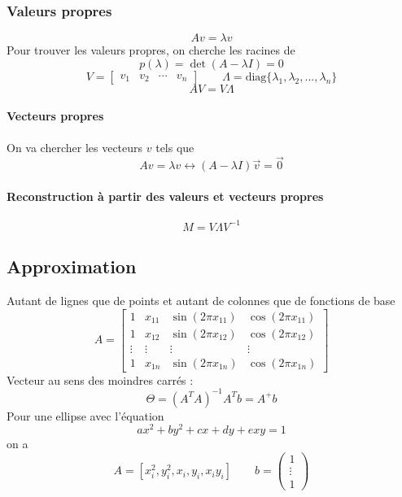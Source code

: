\documentclass[resume]{subfiles}
\begin{document}
\subsubsection{Valeurs propres}
$$Av=\lambda v$$
Pour trouver les valeurs propres, on cherche les racines de
$$p(\lambda)=\det(A-\lambda I)=0$$
$$V=\begin{bmatrix}
v_1 & v_2 & \cdots & v_n
\end{bmatrix}\qquad \Lambda=\text{diag}\lbrace \lambda_1, \lambda_2, ...,\lambda_n\rbrace$$
$$AV=V\Lambda$$
\paragraph{Vecteurs propres}
On va chercher les vecteurs $v$ tels que
$$Av=\lambda v\longleftrightarrow\left(A-\lambda I\right)\vec{v}=\vec{0}$$
\paragraph{Reconstruction à partir des valeurs et vecteurs propres}
$$M=V\Lambda V^{-1}$$
\subsection{Approximation}
Autant de lignes que de points et autant de colonnes que de fonctions de base
$$A=\begin{bmatrix}
1 & x_{11} & \sin(2\pi x_{11}) & \cos(2\pi x_{11})\\
1 & x_{12} & \sin(2\pi x_{12}) & \cos(2\pi x_{12})\\
\vdots & \vdots & \vdots & \vdots\\
1 & x_{1n} & \sin(2\pi x_{1n}) & \cos(2\pi x_{1n})
\end{bmatrix}$$
Vecteur au sens des moindres carrés :
$$\Theta=(A^{T}A)^{-1}A^{T}b=A^{+}b$$
Pour une ellipse avec l'équation
$$ax^2+by^2+cx+dy+exy=1$$
on a
$$A=[x_i^2,y_i^2,x_i,y_i,x_iy_i]\qquad b=\begin{pmatrix}1\\\vdots\\1\end{pmatrix}$$
\end{document}
